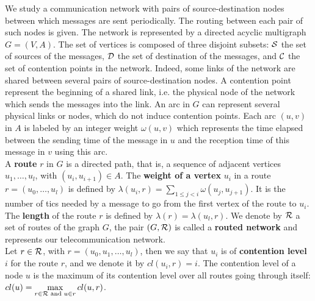 \documentclass[english]{article}
\begin{document}
  We study a communication network with pairs of source-destination nodes between which messages are sent periodically. The routing between each  pair of such nodes is given. The network is represented by a directed acyclic multigraph $G=(V,A)$. The set of vertices is composed of three disjoint subsets:  ${\cal S}$ the set of sources of the messages, ${\cal D}$ the set of destination of the messages, and ${\cal C}$ the set of contention points in the network. Indeed, some links of the network are shared between several pairs of source-destination nodes. A contention point represent the beginning of a shared link, i.e. the physical node of the network which sends the messages into the link. An arc in $G$ can represent several physical links or nodes, which do not induce contention points. Each arc  $(u,v)$ in $A$ is labeled by an integer weight $\omega(u,v)$ which represents the time elapsed between the sending time of the message in $u$ and the reception time of this message in $v$ using this arc. \\
  A {\bf route} $r$ in $G$ is a directed path, that is, a sequence of adjacent vertices $u_1, \ldots , u_{l}$, with $(u_i,u_{i+1}) \in A$.  The {\bf weight of a vertex} $u_i$ in a route $r=(u_0,\dots,u_l)$ is defined by $\lambda(u_i,r)= \sum\limits_{1 \leq j <i} \omega(u_j, u_{j+1})$. It is the number of tics needed by a message to go from the first vertex of the route to $u_i$. The \textbf{length} of the route $r$ is defined by $\lambda (r)= \lambda (u_l,r)$.
	We denote by ${\cal R}$ a set of routes of the graph $G$, the pair $(G,{\cal R})$ is called a \textbf{routed network} and represents our telecommunication network.\\
	Let $r \in {\cal R}$, with $r = (u_0,u_1,\dots,u_l)$, then we say that $u_i$ is of \textbf{contention level} $i$ for the route $r$, and we denote it by $cl(u_i,r) = i$. The contention level of a node $u$ is the maximum of its contention level over all routes going through itself: 
	$cl(u) = \max\limits_{r\in{\cal R} \text{ and } u \in r} cl(u,r)$.
\end{document}
